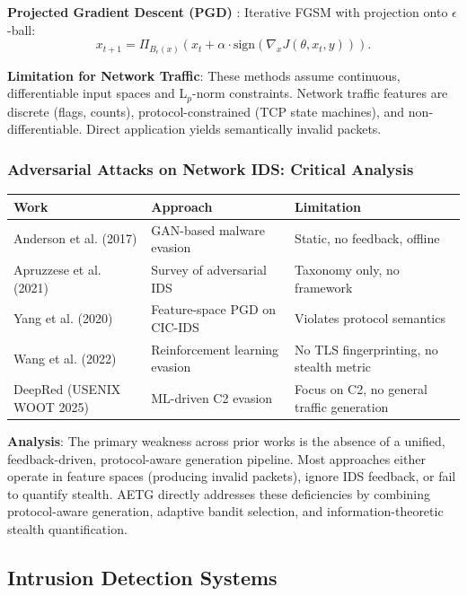 \documentclass[review]{elsarticle}
\begin{document}
\textbf{Projected Gradient Descent (PGD)} \cite{madry2018towards}:
Iterative FGSM with projection onto $\epsilon$-ball:
\[
x_{t+1} = \Pi_{B_\epsilon(x)} \left( x_t + \alpha \cdot \text{sign}(\nabla_x J(\theta, x_t, y)) \right).
\]

\textbf{Limitation for Network Traffic}: These methods assume continuous, differentiable input spaces and L$_p$-norm constraints. Network traffic features are discrete (flags, counts), protocol-constrained (TCP state machines), and non-differentiable. Direct application yields semantically invalid packets.

\subsubsection{Adversarial Attacks on Network IDS: Critical Analysis}
\begin{table}[htbp]
\small
\centering
\renewcommand{\arraystretch}{1.2}
\begin{tabular}{|p{3.6cm}|p{3.6cm}|p{3.8cm}|}
\hline
\textbf{Work} & \textbf{Approach} & \textbf{Limitation} \\
\hline
Anderson et al. (2017) \cite{anderson2017learning} & GAN-based malware evasion & Static, no feedback, offline \\
Apruzzese et al. (2021) \cite{apruzzese2021role} & Survey of adversarial IDS & Taxonomy only, no framework \\
Yang et al. (2020) & Feature-space PGD on CIC-IDS & Violates protocol semantics \\
Wang et al. (2022) \cite{wang2022reinforcement} & Reinforcement learning evasion & No TLS fingerprinting, no stealth metric \\
DeepRed (USENIX WOOT 2025) \cite{deepred2025} & ML-driven C2 evasion & Focus on C2, no general traffic generation \\
\hline
\end{tabular}
\end{table}

\textbf{Analysis}: The primary weakness across prior works is the absence of a unified, feedback-driven, protocol-aware generation pipeline. Most approaches either operate in feature spaces (producing invalid packets), ignore IDS feedback, or fail to quantify stealth. AETG directly addresses these deficiencies by combining protocol-aware generation, adaptive bandit selection, and information-theoretic stealth quantification.

\subsection{Intrusion Detection Systems}
\end{document}
